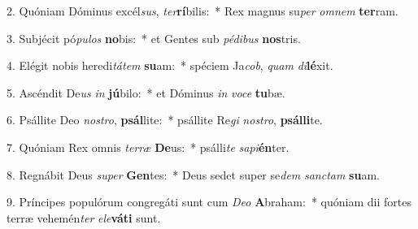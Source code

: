 2. Quóniam Dóminus excél\textit{sus}, \textit{ter}\textbf{rí}bilis:~*  Rex magnus su\textit{per} \textit{om}\textit{nem} \textbf{ter}ram.\

3. Subjécit pó\textit{pu}\textit{los} \textbf{no}bis:~*  et Gentes sub \textit{pé}\textit{di}\textit{bus} \textbf{nos}tris.\

4. Elégit nobis heredi\textit{tá}\textit{tem} \textbf{su}am:~*  spéciem Ja\textit{cob}, \textit{quam} \textit{di}\textbf{lé}xit.\

5. Ascéndit De\textit{us} \textit{in} \textbf{jú}bilo:~*  et Dóminus \textit{in} \textit{vo}\textit{ce} \textbf{tu}bæ.\

6. Psállite Deo \textit{nos}\textit{tro}, \textbf{psál}lite:~*  psállite Re\textit{gi} \textit{nos}\textit{tro}, \textbf{psál}\textbf{li}te.\

7. Quóniam Rex omnis \textit{ter}\textit{ræ} \textbf{De}us:~*  psálli\textit{te} \textit{sa}\textit{pi}\textbf{én}ter.\

8. Regnábit Deus \textit{su}\textit{per} \textbf{Gen}tes:~*  Deus sedet super se\textit{dem} \textit{sanc}\textit{tam} \textbf{su}am.\

9. Príncipes populórum congregáti sunt cum \textit{De}\textit{o} \textbf{A}braham:~*  quóniam dii fortes terræ vehemén\textit{ter} \textit{e}\textit{le}\textbf{vá}\textbf{ti} sunt.\

